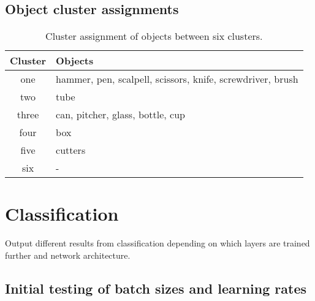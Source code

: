 \subsection{Object cluster assignments}

\begin{figure}
	
	\caption{}
\end{figure}

\begin{table}
	\begin{tabular}{|c|l|}
		\hline
		Cluster & Objects \\
		\hline
		one   & hammer, pen, scalpell, scissors, knife, screwdriver, brush \\
		two   & tube \\
		three & can, pitcher, glass, bottle, cup \\
		four  & box \\
		five  & cutters \\
		six   & - \\
		\hline
	\end{tabular}
	\caption{Cluster assignment of objects between six clusters.}
	\label{tab:object_cluster_assign}
\end{table}





%

\section{Classification}
Output different results from classification depending on which layers are trained further and network architecture.

\subsection{Initial testing of batch sizes and learning rates}

